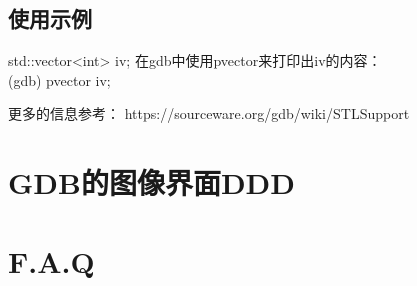 \subsection{使用示例}
std::vector<int> iv;
在gdb中使用pvector来打印出iv的内容：\\
(gdb) pvector iv;


更多的信息参考：
https://sourceware.org/gdb/wiki/STLSupport\cite{gdb-stl-support}

\section{GDB的图像界面DDD}

\section{F.A.Q}


